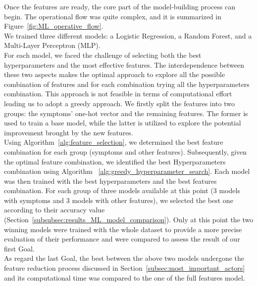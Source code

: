 \noindent
Once the features are ready, the core part of the model-building process can begin. The operational flow was quite complex,
and it is summarized in Figure~\ref{fig:ML_operative_flow}.\\
We trained three different models: a Logistic Regression, a Random Forest, and a Multi-Layer Perceptron (MLP).\\
For each model, we faced the challenge of selecting both the best hyperparameters and the most effective features.
The interdependence between these two aspects makes the optimal approach to explore all the possible combination of features
and for each combination trying all the hyperparameters combination. This approach is not feasible in terms of computational effort
leading us to adopt a greedy approach. We firstly split the features into two
groups: the symptoms' one-hot vector and the remaining features. The former is used to train a base model,
while the latter is utilized to explore the potential improvement brought by the new features.\\
Using Algorithm~\ref{alg:feature_selection}, we determined the best feature combination for each group (symptoms and other features).
Subsequently, given the optimal feature combination, we identified the best Hyperparameters combination using Algorithm
~\ref{alg:greedy_hyperparameter_search}. Each model was then trained with the best hyperparameters and the best features combination.
For each group of three models available at this point (3 models with symptoms and 3 models with other features), we selected the best one
according to their accuracy value (Section~\ref{subsubsec:results_ML_model_comparison}).
Only at this point the two winning models were trained with the whole dataset to provide a more precise evaluation of their performance and
were compared to assess the result of our first Goal.\\
As regard the last Goal, the best between the above two models undergone the feature reduction process
discussed in Section~\ref{subsec:most_important_actors} and its computational time was compared to the one of the full features model.\\

